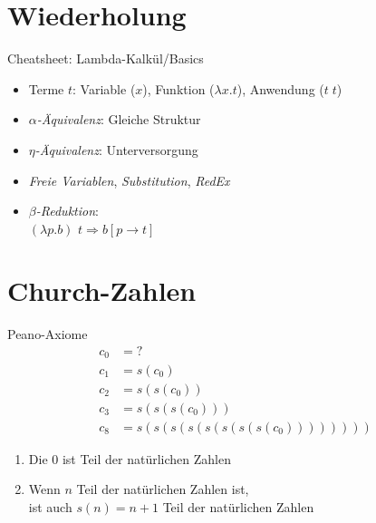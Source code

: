 \documentclass{beamer}
\begin{document}
\section{Wiederholung}

\begin{frame}{Cheatsheet: Lambda-Kalkül/Basics}
  \begin{itemize}
    \item Terme $t$: Variable ($x$), Funktion ($\lambda x . t$), Anwendung ($t \; t$)
    \item \emph{$\alpha$-Äquivalenz}: Gleiche Struktur
    \item \emph{$\eta$-Äquivalenz}: Unterversorgung
    \item \emph{Freie Variablen}, \emph{Substitution}, \emph{RedEx}
    \item \emph{$\beta$-Reduktion}: \\
          $(\lambda{}p.b)$ $t \Rightarrow b\left[p\rightarrow{}t\right]$
  \end{itemize}
\end{frame}

\section{Church-Zahlen}

\begin{frame}{Peano-Axiome}
	\begin{eqnarray*}
		c_0 &= ?\\
		c_1 &= s (c_0)\\
		c_2 &= s (s (c_0))\\
		c_3 &= s (s (s (c_0)))\\
		c_8 &= s (s (s (s (s (s (s (s (c_0))))))))
	\end{eqnarray*}

	\begin{enumerate}
		\item Die 0 ist Teil der natürlichen Zahlen
		\item Wenn $n$ Teil der natürlichen Zahlen ist,\\
	 	      ist auch $s(n) = n + 1$ Teil der natürlichen Zahlen
	\end{enumerate}
\end{frame}
\end{document}
